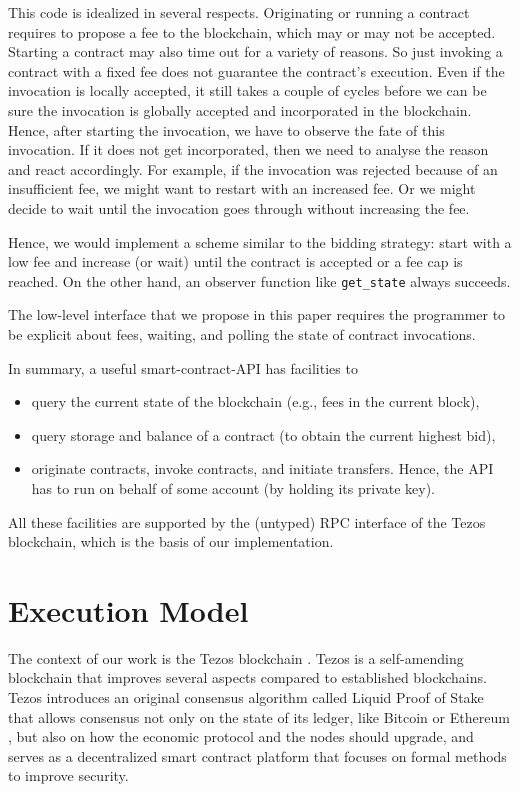 \documentclass[a4paper]{llncs}
\begin{document}
This code is idealized in several respects. Originating or running a contract
requires to propose a fee to the blockchain, which may or may not be
accepted.
Starting a contract may also time out for a variety of reasons. So just
invoking a contract with a fixed fee does not guarantee the contract's
execution.  Even if the invocation is locally accepted, it still takes
a couple of cycles before we can be sure the invocation is globally
accepted and incorporated in the blockchain.
Hence, after starting the invocation, we have to observe the fate of
this invocation. If it does not get incorporated, then we need to
analyse the reason and react accordingly. For example, if the
invocation was rejected because of an insufficient fee, we might want
to restart with an increased fee. Or we might decide to wait until the
invocation goes through without increasing the fee.

Hence, we would implement a scheme similar to
the bidding strategy: start with a low fee and increase (or wait) until the
contract is accepted or a fee cap is reached. On the other hand, an
observer function like \lstinline/get_state/ always succeeds.

The low-level interface that we propose in this paper requires the
programmer to be explicit about fees, waiting, and polling the state
of contract invocations. 

In summary, a useful smart-contract-API  has facilities to
\begin{itemize}
\item query the current state of the blockchain (e.g., fees in the
  current block),
\item query storage and balance of a contract (to obtain
  the current highest bid),
\item originate contracts, invoke contracts, and initiate
  transfers. Hence, the API has to run on
  behalf of some account (by holding its private key).
\end{itemize}
All these facilities are supported by the (untyped) RPC interface of the Tezos
blockchain, which is the basis of our implementation. 

\section{Execution Model}
\label{sec:execution-model}
The context of our work is the Tezos blockchain \cite{tezos-whitepaper,tezos-intropaper}. Tezos is a self-amending blockchain that improves several aspects compared to established 
blockchains. Tezos introduces an original consensus algorithm called Liquid Proof of Stake that allows consensus not only on the state of its ledger, like Bitcoin \cite{bitcoin-whitepaper} or Ethereum \cite{eth-whitepaper}, but also on how the economic protocol and the nodes should  upgrade, and serves as a decentralized smart contract platform that focuses on formal methods to improve security. 
\end{document}
